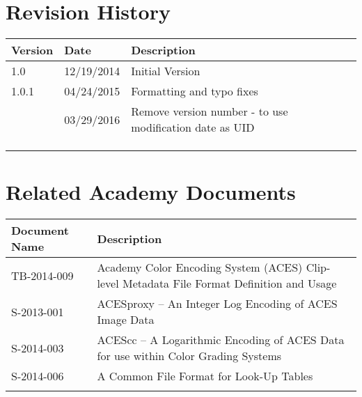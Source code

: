 \prelimsectionformat	%
\chapter{Revision History}

\begin{tabularx}{\linewidth}{|l|l|X|}
    \hline
    Version & Date       & Description \\ \hline
    1.0     & 12/19/2014 & Initial Version
    \\ \hline
    1.0.1   & 04/24/2015 & Formatting and typo fixes \\ \hline
            & 03/29/2016 & Remove version number - to use modification date as UID \\ \hline
    &   &   \\ \hline
    &   &   \\ \hline
    &   &   \\ \hline
\end{tabularx}

\vspace{0.25in} %
\chapter{Related Academy Documents} %
\begin{tabularx}{\linewidth}{|l|X|}
    \hline
    Document Name & Description \\ \hline
    TB-2014-009 & Academy Color Encoding System (ACES) Clip-level Metadata File Format Definition and Usage \\ \hline
    S-2013-001 & ACESproxy -- An Integer Log Encoding of ACES Image Data \\ \hline
    S-2014-003 & ACEScc -- A Logarithmic Encoding of ACES Data for use within Color Grading Systems \\ \hline
    S-2014-006 & A Common File Format for Look-Up Tables \\ \hline
    & \\ \hline
\end{tabularx}